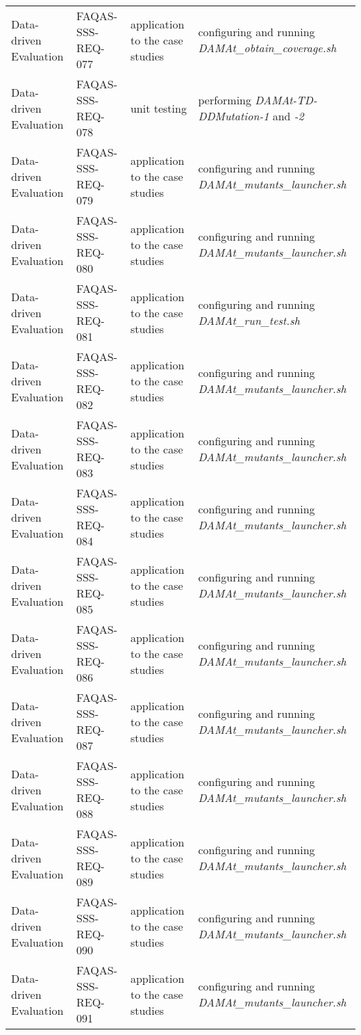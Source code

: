 \begin{table}[H]
{\begin{tabular}{|l|l|l|l|}
Data-driven Evaluation & FAQAS-SSS-REQ-077 & application to the case studies & configuring and running \emph{DAMAt\_obtain\_coverage.sh} \\
Data-driven Evaluation & FAQAS-SSS-REQ-078 & unit testing &  performing \emph{DAMAt-TD-DDMutation-1} and \emph{-2} \\
Data-driven Evaluation & FAQAS-SSS-REQ-079 & application to the case studies & configuring and running \emph{DAMAt\_mutants\_launcher.sh}\\
Data-driven Evaluation & FAQAS-SSS-REQ-080 & application to the case studies & configuring and running \emph{DAMAt\_mutants\_launcher.sh} \\
Data-driven Evaluation & FAQAS-SSS-REQ-081 & application to the case studies & configuring and running \emph{DAMAt\_run\_test.sh}\\
Data-driven Evaluation & FAQAS-SSS-REQ-082 & application to the case studies & configuring and running \emph{DAMAt\_mutants\_launcher.sh} \\
Data-driven Evaluation & FAQAS-SSS-REQ-083 & application to the case studies & configuring and running \emph{DAMAt\_mutants\_launcher.sh} \\
Data-driven Evaluation & FAQAS-SSS-REQ-084 & application to the case studies & configuring and running \emph{DAMAt\_mutants\_launcher.sh} \\
Data-driven Evaluation & FAQAS-SSS-REQ-085 & application to the case studies & configuring and running \emph{DAMAt\_mutants\_launcher.sh} \\
Data-driven Evaluation & FAQAS-SSS-REQ-086 & application to the case studies & configuring and running \emph{DAMAt\_mutants\_launcher.sh} \\
Data-driven Evaluation & FAQAS-SSS-REQ-087 & application to the case studies & configuring and running \emph{DAMAt\_mutants\_launcher.sh} \\
Data-driven Evaluation & FAQAS-SSS-REQ-088 & application to the case studies & configuring and running \emph{DAMAt\_mutants\_launcher.sh} \\
Data-driven Evaluation & FAQAS-SSS-REQ-089 & application to the case studies & configuring and running \emph{DAMAt\_mutants\_launcher.sh} \\
Data-driven Evaluation & FAQAS-SSS-REQ-090 & application to the case studies & configuring and running \emph{DAMAt\_mutants\_launcher.sh} \\
Data-driven Evaluation & FAQAS-SSS-REQ-091 & application to the case studies & configuring and running \emph{DAMAt\_mutants\_launcher.sh} \\

\end{tabular}}
\end{table}
